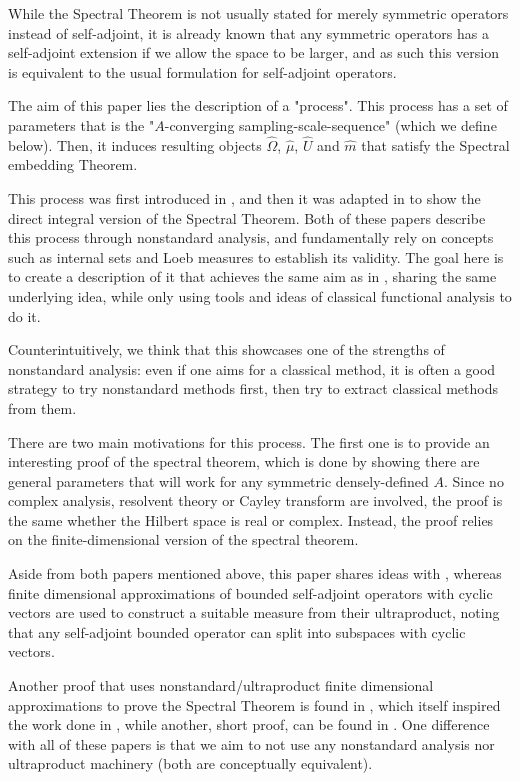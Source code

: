 \documentclass[10pt,a4paper]{amsart}
\def \HOM{\hat{\Omega}}
\def \HMU{\hat{\mu}}
\def \HU{\hat{U}}
\def \Hm{\hat{m}}
\begin{document}
While the Spectral Theorem is not usually stated for merely symmetric operators instead of self-adjoint, it is already known that any symmetric operators has a self-adjoint extension if we allow the space to be larger, and as such this version is equivalent to the usual formulation for self-adjoint operators.


The aim of this paper lies the description of a "process". This process has a set of parameters that is the "$A$-converging sampling-scale-sequence" (which we define below). Then, it induces resulting objects $\HOM$, $\HMU$, $\HU$ and $\Hm$ that satisfy the Spectral embedding Theorem.

 This process was first introduced in \cite{nonez2024spectralequivalencesnonstandardsamplings}, and then it was adapted in \cite{goldbring2025nonstandardapproachdirectintegral} to show the direct integral version of the Spectral Theorem. Both of these papers describe this process through nonstandard analysis, and fundamentally rely on concepts such as internal sets and Loeb measures to establish its validity. The goal here is to create a description of it that achieves the same aim as in \cite{nonez2024spectralequivalencesnonstandardsamplings}, sharing the same underlying idea, while only using tools and ideas of classical functional analysis to do it. 
 
 Counterintuitively, we think that this showcases one of the strengths of nonstandard analysis: even if one aims for a classical method, it is often a good strategy to try nonstandard methods first, then try to extract classical methods from them.

There are two main motivations for this process. The first one is to provide an interesting proof of the spectral theorem, which is done by showing there are general parameters that will work for any symmetric densely-defined $A$. Since no complex analysis, resolvent theory or Cayley transform are involved, the proof is the same whether the Hilbert space is real or complex. Instead, the proof relies on the finite-dimensional version of the spectral theorem.

Aside from both papers mentioned above, this paper shares ideas with \cite{HIRVONEN_HYTTINEN_2024}, whereas finite dimensional approximations of bounded self-adjoint operators with cyclic vectors are used to construct a suitable measure from their ultraproduct, noting that any self-adjoint bounded operator can split into subspaces with cyclic vectors.

Another proof that uses nonstandard/ultraproduct finite dimensional approximations to prove the Spectral Theorem is found in \cite{GOLDBRING2021590}, which itself inspired the work done in \cite{nonez2024spectralequivalencesnonstandardsamplings}, while another, short proof, can be found in \cite{matsunaga2024shortnonstandardproofspectral}. One difference with all of these papers is that we aim to not use any nonstandard analysis nor ultraproduct machinery (both are conceptually equivalent).
\end{document}
